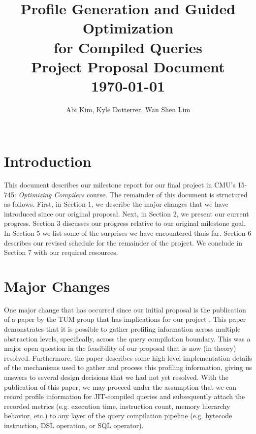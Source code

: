 \documentclass{vldb}
\newcommand{\paperTitle}{Profile Generation and Guided Optimization\\ for Compiled Queries\\ 
    \large Project Proposal Document\\
    \today}
\begin{document}
\title{\paperTitle}

\author{
    \alignauthor Abi Kim, Kyle Dotterrer, Wan Shen Lim\\
    \\
}

\makeatletter
\def\@copyrightspace{\relax}
\makeatother

\maketitle


\section{Introduction}

This document describes our milestone report for our final project in CMU's 15-745: \textit{Optimizing Compilers} course. The remainder of this document is structured as follows. First, in Section 1, we describe the major changes that we have introduced since our original proposal. Next, in Section 2, we present our current progress. Section 3 discusses our progress relative to our original milestone goal. In Section 5 we list some of the surprises we have encountered thuis far. Section 6 describes our revised schedule for the remainder of the project. We conclude in Section 7 with our required resources.


\section{Major Changes}

One major change that has occurred since our initial proposal is the publication of a paper by the TUM group that has implications for our project \cite{beischl21}. This paper demonstrates that it is possible to gather profiling information across multiple abstraction levels, specifically, across the query compilation boundary. This was a major open question in the feasibility of our proposal that is now (in theory) resolved. Furthermore, the paper describes some high-level implementation details of the mechanisms used to gather and process this profiling information, giving us answers to several design decisions that we had not yet resolved. With the publication of this paper, we may proceed under the assumption that we can record profile information for JIT-compiled queries and subsequently attach the recorded metrics (e.g. execution time, instruction count, memory hierarchy behavior, etc.) to any layer of the query compilation pipeline (e.g. bytecode instruction, DSL operation, or SQL operator).
\end{document}
